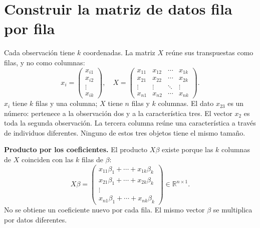 \documentclass[11pt,a4paper]{article}
\newcommand{\R}{\mathbb R}
\begin{document}
\clearpage
\section{Construir la matriz de datos fila por fila}\label{logit7}
Cada observación tiene $k$ coordenadas. La matriz $X$ reúne sus
transpuestas como filas, y no como columnas:
\[
x_i=\begin{pmatrix}x_{i1}\\x_{i2}\\\vdots\\x_{ik}\end{pmatrix},
\quad
X=\begin{pmatrix}
x_{11}&x_{12}&\cdots&x_{1k}\\
x_{21}&x_{22}&\cdots&x_{2k}\\
\vdots&\vdots&\ddots&\vdots\\
x_{n1}&x_{n2}&\cdots&x_{nk}
\end{pmatrix}.
\]
$x_i$ tiene $k$ filas y una columna; $X$ tiene $n$ filas y $k$ columnas.
El dato $x_{23}$ es un número: pertenece a la observación dos y a
la característica tres. El vector $x_2$ es toda la segunda observación.
La tercera columna reúne una característica a través de individuos
diferentes. Ninguno de estos tres objetos tiene el mismo tamaño.

\textbf{Producto por los coeficientes.}
El producto $X\beta$ existe porque las $k$ columnas de $X$ coinciden
con las $k$ filas de $\beta$:
\[
X\beta=
\begin{pmatrix}
x_{11}\beta_1+\cdots+x_{1k}\beta_k\\
x_{21}\beta_1+\cdots+x_{2k}\beta_k\\
\vdots\\x_{n1}\beta_1+\cdots+x_{nk}\beta_k
\end{pmatrix}\in\R^{n\times1}.
\]
No se obtiene un coeficiente nuevo por cada fila. El mismo vector
$\beta$ se multiplica por datos diferentes.
\end{document}
